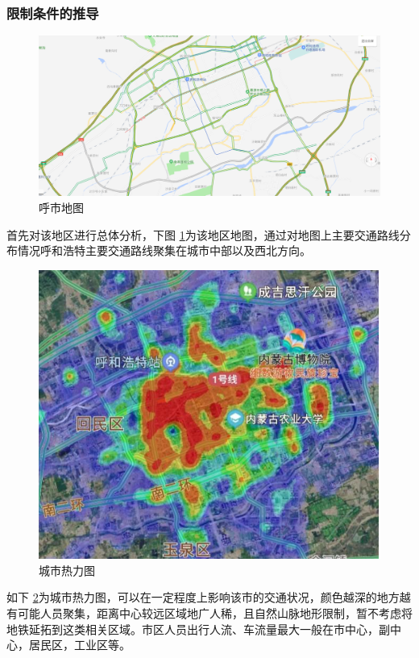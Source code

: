 \documentclass[12pt,a4paper]{mcmthesis}
\begin{document}
    \subsubsection{限制条件的推导}
    \begin{figure}[h!t]
        \centerline{\includegraphics[scale=0.6]{figures/呼市地图}\quad}
        \caption{\song\wuhao 呼市地图}
        \label{fig:呼市地图}
    \end{figure}
    首先对该地区进行总体分析，下图 \ref{fig:呼市地图}为该地区地图，通过对地图上主要交通路线分布情况呼和浩特主要交通路线聚集在城市中部以及西北方向。
    \begin{figure}[h!t]
        \centerline{\includegraphics[scale=0.6]{figures/城市热力图}\quad}
        \caption{\song\wuhao 城市热力图}
        \label{fig:城市热力图}
    \end{figure}

    如下 \ref{fig:城市热力图}为城市热力图，可以在一定程度上影响该市的交通状况，颜色越深的地方越有可能人员聚集，距离中心较远区域地广人稀，且自然山脉地形限制，暂不考虑将地铁延拓到这类相关区域。市区人员出行人流、车流量最大一般在市中心，副中心，居民区，工业区等。
\end{document}
